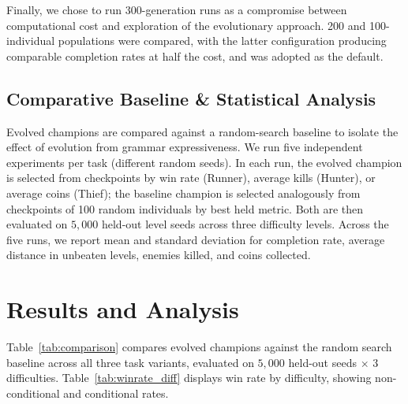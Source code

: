 \documentclass[runningheads]{llncs}
\begin{document}
Finally, we chose to run 300-generation runs as a compromise between computational cost and exploration of the evolutionary approach. 200 and 100-individual populations were compared, with the latter configuration producing comparable completion rates at half the cost, and was adopted as the default.

\subsection{Comparative Baseline \& Statistical Analysis}

Evolved champions are compared against a random-search baseline to isolate the effect of evolution from grammar expressiveness. We run five independent experiments per task (different random seeds). In each run, the evolved champion is selected from checkpoints by win rate (Runner), average kills (Hunter), or average coins (Thief); the baseline champion is selected analogously from checkpoints of 100 random individuals by best held metric. Both are then evaluated on $5{,}000$ held-out level seeds across three difficulty levels. Across the five runs, we report mean and standard deviation for completion rate, average distance in unbeaten levels, enemies killed, and coins collected.


\section{Results and Analysis}
\label{sec:results}

Table~\ref{tab:comparison} compares evolved champions against the random search baseline across all three task variants, evaluated on $5{,}000$ held-out seeds $\times$ 3 difficulties. Table~\ref{tab:winrate_diff} displays win rate by difficulty, showing non-conditional and conditional rates.
\end{document}
